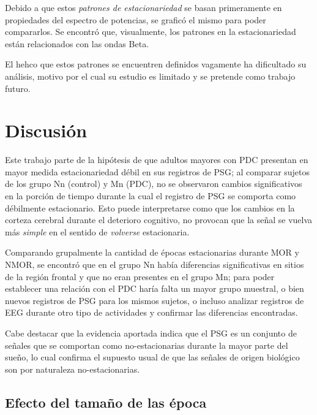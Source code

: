 Debido a que estos \textit{patrones de estacionariedad} se basan primeramente en propiedades del
espectro de potencias, se graficó el mismo para poder compararlos. Se encontró que, visualmente,
los patrones en la estacionariedad están relacionados con las ondas Beta.

El hehco que estos patrones se encuentren definidos vagamente ha dificultado su análisis, motivo
por el cual su estudio es limitado y se pretende como trabajo futuro.


\section{Discusión}

Este trabajo parte de la hipótesis de que adultos mayores con PDC presentan en mayor medida 
estacionariedad débil en sus registros de PSG; al comparar sujetos de los grupo Nn (control) y Mn 
(PDC), no se observaron cambios significativos en la porción de tiempo durante la cual el registro 
de PSG se comporta como débilmente estacionario. 
Esto puede interpretarse como que los cambios en la corteza cerebral durante el deterioro 
cognitivo, no provocan que  la señal se vuelva más \textit{simple} en el sentido de 
\textit{volverse} estacionaria.

Comparando grupalmente la cantidad de épocas estacionarias durante MOR y NMOR, se encontró que en 
el grupo Nn había diferencias significativas en sitios de la región frontal y que no eran presentes
en el grupo Mn; para poder establecer una relación con el PDC haría falta un mayor grupo muestral, 
o bien nuevos registros de PSG para los mismos sujetos, o incluso analizar registros de EEG durante 
otro tipo de actividades y confirmar las diferencias encontradas.

Cabe destacar que la evidencia aportada indica que el PSG es un conjunto de señales que se comportan
como no-estacionarias durante la mayor parte del sueño, lo cual confirma el supuesto usual de que 
las señales de origen biológico son por naturaleza no-estacionarias. 

\subsection{Efecto del tamaño de las época}

